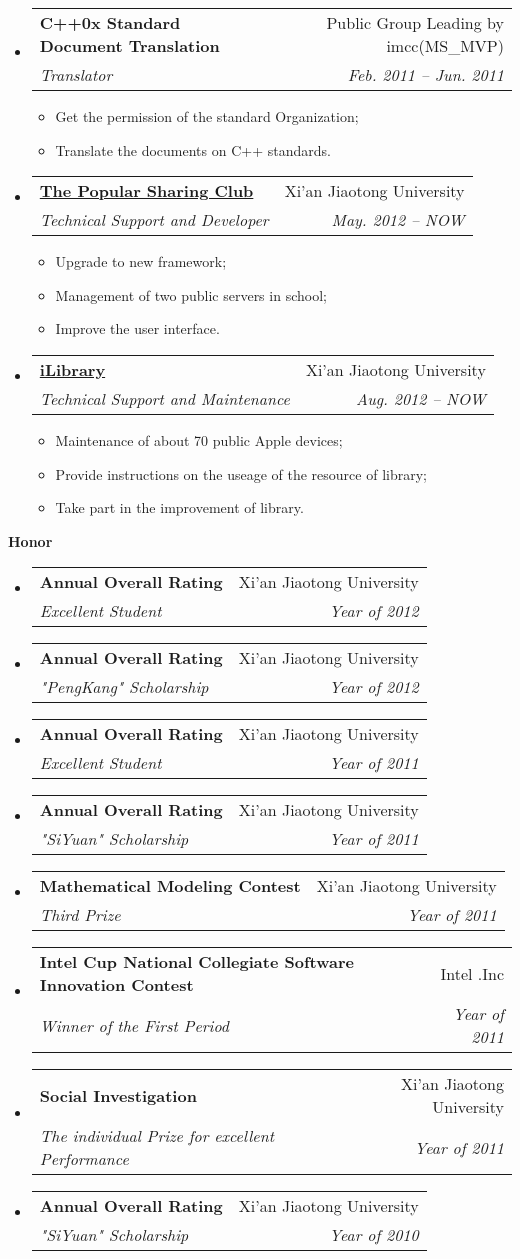 \documentclass[letterpaper,11pt]{article}
\makeatletter
\newcommand{\resitem}[1]{\item #1 \vspace{-2pt}}
\newcommand{\resheading}[1]{{\large \colorbox{mygrey}{\begin{minipage}{\textwidth}{\textbf{#1 \vphantom{p\^{E}}}}\end{minipage}}}}
\newcommand{\ressubheading}[4]{
\begin{tabular*}{6.5in}{l@{\extracolsep{\fill}}r}
		\textbf{#1} & #2 \\
		\textit{#3} & \textit{#4} \\
\end{tabular*}\vspace{-6pt}}
\makeatother
\begin{document}
\begin{itemize}
{\begin{itemize}
				\end{itemize}
				}
		\item
			\ressubheading{C++0x Standard Document Translation}{Public Group Leading by imcc(MS\_MVP)}{Translator} {Feb. 2011 -- Jun. 2011}
				{ \footnotesize
				\begin{itemize}
					\resitem{Get the permission of the standard Organization;}
					\resitem{Translate the documents on C++ standards.}
				\end{itemize}
          		}
		\item 
			\ressubheading{\href{http://pt.xjtuns.cn/}{The Popular Sharing Club}}{Xi'an Jiaotong University}{Technical Support and Developer}{May. 2012 -- NOW}
				{ \footnotesize
				\begin{itemize}
					\resitem{Upgrade to new framework;}
					\resitem{Management of two public servers in school;}
					\resitem{Improve the user interface.}
				\end{itemize}
				}
		\item 
			\ressubheading{\href{http://www.lib.xjtu.edu.cn/}{iLibrary}}{Xi'an Jiaotong University}{Technical Support and Maintenance}{Aug. 2012 -- NOW}
				{ \footnotesize
				\begin{itemize}
					\resitem{Maintenance of about 70 public Apple devices;}
					\resitem{Provide instructions on the useage of the resource of library;}
					\resitem{Take part in the improvement of library.}
				\end{itemize}
				}
	\end{itemize}		
	
\resheading{Honor}
	\begin{itemize}
		\item
			\ressubheading{Annual Overall Rating}{Xi'an Jiaotong University}{Excellent Student}{Year of 2012}
		\item
			\ressubheading{Annual Overall Rating}{Xi'an Jiaotong University}{"PengKang" Scholarship}{Year of 2012}
		\item
			\ressubheading{Annual Overall Rating}{Xi'an Jiaotong University}{Excellent Student}{Year of 2011}
		\item
			\ressubheading{Annual Overall Rating}{Xi'an Jiaotong University}{"SiYuan" Scholarship}{Year of 2011}
		\item
			\ressubheading{Mathematical Modeling Contest}{Xi'an Jiaotong University}{Third Prize}{Year of 2011}
		\item
			\ressubheading{Intel Cup National Collegiate Software Innovation Contest}{Intel .Inc}{Winner of the First Period}{Year of 2011}
		\item
			\ressubheading{Social Investigation}{Xi'an Jiaotong University}{The individual Prize for excellent Performance}{Year of 2011}
		\item
			\ressubheading{Annual Overall Rating}{Xi'an Jiaotong University}{"SiYuan" Scholarship}{Year of 2010}
		\end{itemize}
	
\end{document}
